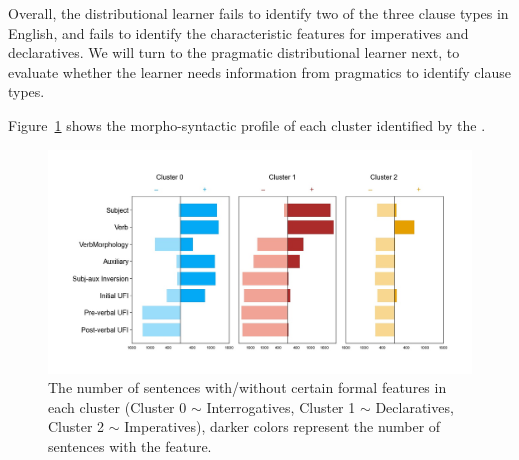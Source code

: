 Overall, the distributional learner fails to identify two of the three clause types in English, and fails to identify the characteristic features for imperatives and declaratives. We will turn to the pragmatic distributional learner next, to evaluate whether the learner needs information from pragmatics to identify clause types.


Figure~\ref{fig:target-syncluster} shows the morpho-syntactic profile of each cluster identified by the \plearnerabbr{}. 

\begin{figure}[H]
    \centering
    \includegraphics[width=1\textwidth]{figures/target-syncluster.jpg}
    \caption{The number of sentences with/without certain formal features in each cluster (Cluster 0 $\sim$ Interrogatives, Cluster 1 $\sim$ Declaratives, Cluster 2 $\sim$ Imperatives), darker colors represent the number of sentences with the feature.}
    \label{fig:target-syncluster}
\end{figure}


